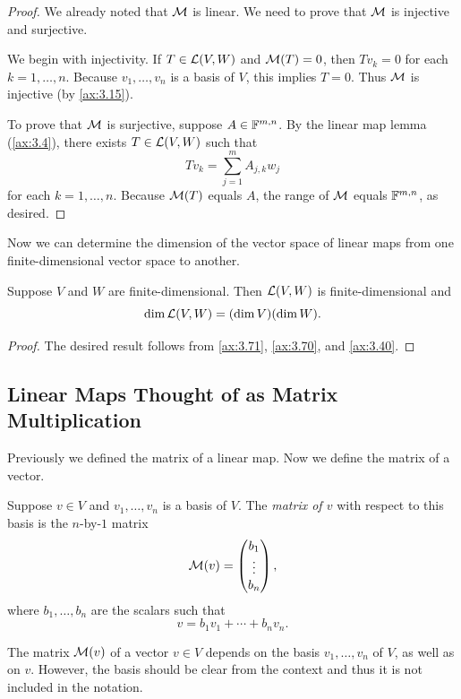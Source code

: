 \begin{proof}
We already noted that $\mathcal{M}$ is linear. We need to prove that $\mathcal{M}$ is
injective and surjective.

We begin with injectivity. If $T\in\mathcal{L}(V,W)$ and $\mathcal{M}(T)=0$, then $Tv_k=0$
for each $k=1,\dots,n$. Because $v_1,\dots,v_n$ is a basis of $V$, this implies
$T=0$. Thus $\mathcal{M}$ is injective (by \ref{ax:3.15}).

To prove that $\mathcal{M}$ is surjective, suppose $A\in\mathbb{F}^{m,n}$. By the linear map
lemma (\ref{ax:3.4}), there exists $T\in\mathcal{L}(V,W)$ such that
\[ Tv_k = \sum_{j=1}^m A_{j,k}w_j \]
for each $k=1,\dots,n$. Because $\mathcal{M}(T)$ equals $A$, the range of $\mathcal{M}$
equals $\mathbb{F}^{m,n}$, as desired.
\end{proof}

Now we can determine the dimension of the vector space of linear maps from one
finite-dimensional vector space to another.

\begin{result}[$\dim\Lin(V,W)=(\dim V)(\dim W)$]\label{ax:3.72}
Suppose $V$ and $W$ are finite-dimensional. Then $\mathcal{L}(V,W)$ is
finite-dimensional and
\[ \operatorname{dim}\mathcal{L}(V,W) = (\operatorname{dim} V)(\operatorname{dim} W). \]
\end{result}

\begin{proof}
The desired result follows from \ref{ax:3.71}, \ref{ax:3.70}, and
\ref{ax:3.40}.
\end{proof}

\subsection{Linear Maps Thought of as Matrix Multiplication}

Previously we defined the matrix of a linear map. Now we define the matrix of a
vector.

\begin{definition}\label{ax:3.73}
Suppose $v\in V$ and $v_1,\dots,v_n$ is a basis of $V$. The \emph{matrix of $v$}
with respect to this basis is the $n$-by-$1$ matrix
\[ \mathcal{M}(v) = \begin{pmatrix} b_1\\ \vdots\\ b_n \end{pmatrix}, \]
where $b_1,\dots,b_n$ are the scalars such that
\[ v = b_1v_1+\cdots+b_nv_n. \]
\end{definition}

The matrix $\mathcal{M}(v)$ of a vector $v\in V$ depends on the basis $v_1,\dots,v_n$
of $V$, as well as on $v$. However, the basis should be clear from the context
and thus it is not included in the notation.

